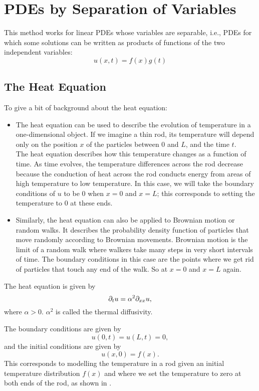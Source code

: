 \section{PDEs by Separation of Variables}

This method works for linear PDEs whose variables are separable, i.e., PDEs for which some solutions can be written as products of functions of the two independent variables:
\[
u(x,t) = f(x)g(t)
\]

\subsection{The Heat Equation}

To give a bit of background about the heat equation:
\begin{itemize}
	\item The heat equation can be used to describe the evolution of temperature in a one-dimensional object. If we imagine a thin rod, its temperature will depend only on the position $x$ of the particles between $0$ and $L$, and the time $t$. \\
	The heat equation describes how this temperature changes as a function of time. As time evolves, the temperature differences across the rod decrease because the conduction of heat across the rod conducts energy from areas of high temperature to low temperature. In this case, we will take the boundary conditions of $u$ to be 0 when $x=0$ and $x=L$; this corresponds to setting the temperature to 0 at these ends.
	
	\item Similarly, the heat equation can also be applied to Brownian motion or random walks. It describes the probability density function of particles that move randomly according to Brownian movements. Brownian motion is the limit of a random walk where walkers take many steps in very short intervals of time. The boundary conditions in this case are the points where we get rid of particles that touch any end of the walk. So at $x=0$ and $x=L$ again.
\end{itemize}

The heat equation is given by 
\begin{equation}\label{eq5.1}
	\partial_t u = \alpha^2 \partial_{xx} u,
\end{equation} 
where $\alpha > 0$. $\alpha^2$ is called the thermal diffusivity.

The boundary conditions are given by
\[
u(0,t) = u(L,t) = 0,
\]
and the initial conditions are given by
\[
u(x,0) = f(x).
\]
This corresponds to modelling the temperature in a rod given an initial temperature distribution $f(x)$ and where we set the temperature to zero at both ends of the rod, as shown in .

